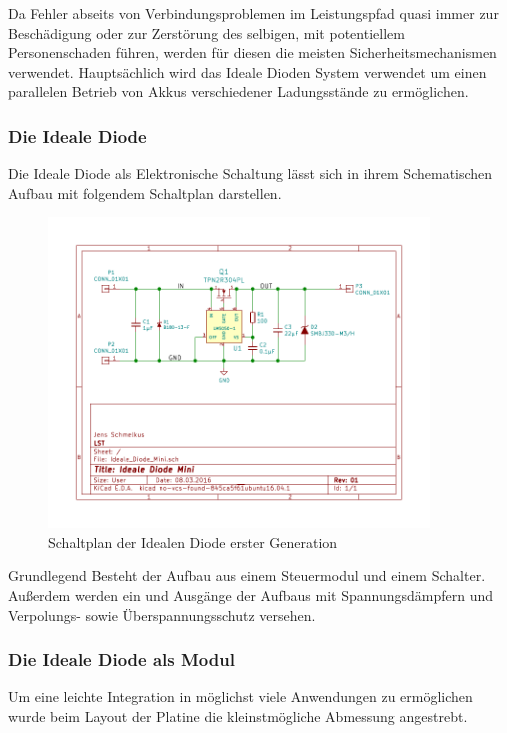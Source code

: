 Da Fehler abseits von Verbindungsproblemen im Leistungspfad quasi immer zur Beschädigung oder zur Zerstörung des selbigen, mit potentiellem Personenschaden führen, werden für diesen die meisten Sicherheitsmechanismen verwendet.
Hauptsächlich wird das Ideale Dioden System verwendet um einen parallelen Betrieb von Akkus verschiedener Ladungsstände zu ermöglichen.

\subsubsection{Die Ideale Diode}

Die Ideale Diode als Elektronische Schaltung lässt sich in ihrem Schematischen Aufbau mit folgendem Schaltplan darstellen.

\begin{figure}[H]
\centering
\includegraphics[width=0.9\textwidth]{Schaltplaene/Ideale_Diode_Mini.pdf} 
\caption{Schaltplan der Idealen Diode erster Generation} 
\label{fig:Schaltplan der Idealen Diode erster Generation}
\end{figure}

Grundlegend Besteht der Aufbau aus einem Steuermodul und einem Schalter. Außerdem werden ein und Ausgänge der Aufbaus mit Spannungsdämpfern und Verpolungs- sowie Überspannungsschutz versehen.



\subsubsection{Die Ideale Diode als Modul}

Um eine leichte Integration in möglichst viele Anwendungen zu ermöglichen wurde beim Layout der Platine die kleinstmögliche Abmessung angestrebt. 

